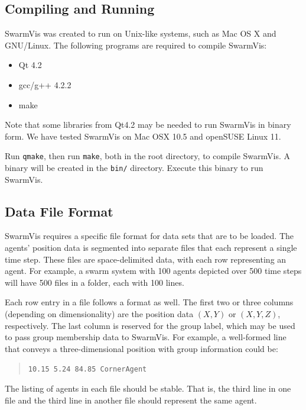 \documentclass[conference]{IEEEtran}
\begin{document}




\subsection{Compiling and Running}
SwarmVis was created to run on Unix-like systems, such as Mac OS X and GNU/Linux.
The following programs are required to compile SwarmVis:
\begin{itemize}
\item Qt 4.2
\item gcc/g++ 4.2.2
\item make
\end{itemize}
Note that some libraries from Qt4.2 may be needed to run SwarmVis in binary form.
We have tested SwarmVis on Mac OSX 10.5 and openSUSE Linux 11.

Run \texttt{qmake}, then run \texttt{make}, both in the root directory, to compile SwarmVis.
A binary will be created in the \texttt{bin/} directory. Execute this binary to run SwarmVis.

\subsection{Data File Format}
SwarmVis requires a specific file format for data sets that are to be loaded. The agents' position data is segmented into
separate files that each represent a single time step. These files are space-delimited data, with
each row representing an agent. For example, a swarm system with 100 agents depicted over 500 time steps
will have 500 files in a folder, each with 100 lines.

Each row entry in a file follows a format as well. The first two or three  columns (depending on dimensionality) are the
position data $(X, Y)$ or $(X, Y, Z)$, respectively. The last column is reserved for the group label, which may be used to pass
group membership data to SwarmVis.
For example, a well-formed line that conveys a three-dimensional
position with group information could be:
\begin{quote}
\texttt{10.15 5.24 84.85 CornerAgent}
\end{quote}
The listing of agents in each file should be stable. That is, the third line in one file and the third line in another file
should represent the same agent.
\end{document}
